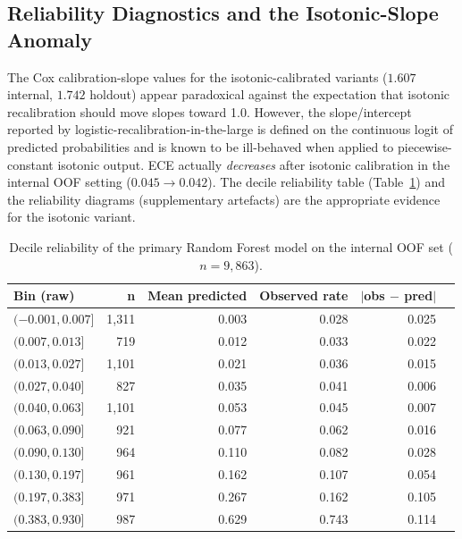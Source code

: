 \documentclass[11pt,a4paper]{article}
\begin{document}
\subsection{Reliability Diagnostics and the Isotonic-Slope Anomaly}
The Cox calibration-slope values for the isotonic-calibrated variants ($1.607$ internal, $1.742$
holdout) appear paradoxical against the expectation that isotonic recalibration should move slopes
toward 1.0. However, the slope/intercept reported by logistic-recalibration-in-the-large is defined
on the continuous logit of predicted probabilities and is known to be ill-behaved when applied to
piecewise-constant isotonic output\cite{NiculescuMizil2005,VanCalster2019}. ECE actually
\emph{decreases} after isotonic calibration in the internal OOF setting ($0.045 \rightarrow 0.042$).
The decile reliability table (Table~\ref{tab:reliability-oof}) and the reliability diagrams
(supplementary artefacts) are the appropriate evidence for the isotonic variant.

\begin{table}[h!]
\centering
\small
\caption{Decile reliability of the primary Random Forest model on the internal OOF set
($n=9{,}863$).}
\label{tab:reliability-oof}
\begin{tabular}{lrrrrr}
\toprule
Bin (raw) & n & Mean predicted & Observed rate & $|$obs $-$ pred$|$ \\
\midrule
$(-0.001, 0.007]$ & 1{,}311 & 0.003 & 0.028 & 0.025 \\
$(0.007, 0.013]$  &   719   & 0.012 & 0.033 & 0.022 \\
$(0.013, 0.027]$  & 1{,}101 & 0.021 & 0.036 & 0.015 \\
$(0.027, 0.040]$  &   827   & 0.035 & 0.041 & 0.006 \\
$(0.040, 0.063]$  & 1{,}101 & 0.053 & 0.045 & 0.007 \\
$(0.063, 0.090]$  &   921   & 0.077 & 0.062 & 0.016 \\
$(0.090, 0.130]$  &   964   & 0.110 & 0.082 & 0.028 \\
$(0.130, 0.197]$  &   961   & 0.162 & 0.107 & 0.054 \\
$(0.197, 0.383]$  &   971   & 0.267 & 0.162 & 0.105 \\
$(0.383, 0.930]$  &   987   & 0.629 & 0.743 & 0.114 \\
\bottomrule
\end{tabular}
\end{table}
\end{document}
